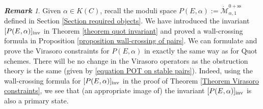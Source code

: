 \documentclass[11pt]{amsart}
\theoremstyle{remark}
\newtheorem{remark}[theorem]{\bf Remark}
\newcommand{\Mdash}{\acute{\mathcal{M}}}
\newcommand{\inv}[0]{\textnormal{inv}}
\renewcommand{\ss}[0]{\text{ss}}
\numberwithin{theorem}{section}
\begin{document}
\begin{remark}\label{remark Virasoro for pairs}
    Given $\alpha \in K(C)$,
    recall the moduli space $P(E,\alpha) := \Mdash^{0+\ss}_{\alpha,1}$
    defined in Section \ref{Section required objects}.
    We have introduced the invariant 
    $[P(E,\alpha)]_\inv$ in Theorem \ref{theorem quot invariant}
    and proved a wall-crossing formula in Proposition \ref{proposition wall-crossing of pairs}.
    We can formulate and prove the Virasoro constraints for $P(E,\alpha)$ in exactly the same way as for Quot schemes.
    There will be no change in the Virasoro operators 
    as the obstruction theory is the same (given by \eqref{equation POT on stable pairs}).
    Indeed, using the wall-crossing formula for $[P(E,\alpha)]_\inv$ in the proof of Theorem \ref{Theorem Virasoro constraints},
    we see that (an appropriate image of) the invariant $[P(E,\alpha)]_\inv$ is also a primary state.
\end{remark}

\vspace{.2cm}
\end{document}
